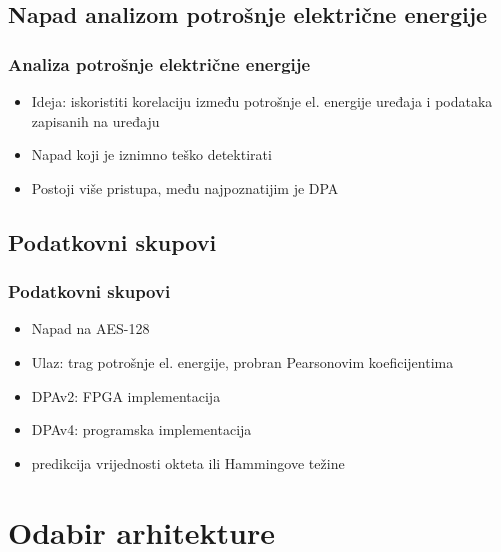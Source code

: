 \documentclass{beamer}
\begin{document}
\subsection{Napad analizom potrošnje električne energije} 

\begin{frame}
\frametitle{Analiza potrošnje električne energije}
\begin{itemize}
\item Ideja: iskoristiti korelaciju između potrošnje el. energije uređaja i podataka zapisanih na uređaju
\item Napad koji je iznimno teško detektirati
\item Postoji više pristupa, među najpoznatijim je DPA
\end{itemize}

\end{frame}

\subsection{Podatkovni skupovi} 

\begin{frame}
\frametitle{Podatkovni skupovi}
\begin{itemize}
\item Napad na AES-128
\item Ulaz: trag potrošnje el. energije, probran Pearsonovim koeficijentima
\item DPAv2: FPGA implementacija
\item DPAv4: programska implementacija
\item predikcija vrijednosti okteta ili Hammingove težine
\end{itemize}
\end{frame}

\section{Odabir arhitekture} 
\end{document}
